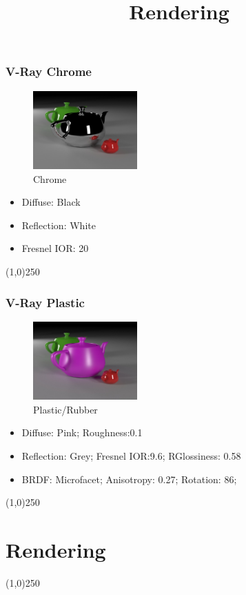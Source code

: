 \begin{frame}
\frametitle{V-Ray Chrome}
\begin{figure}
	\centering
	\includegraphics[height=3cm]{./Materials/Chrome}
	\caption{Chrome}
	\label{fig:Chrome}
\end{figure}
\begin{itemize}
	\item Diffuse: Black
	\item Reflection: White
	\item Fresnel IOR: 20 
\end{itemize}
\end{frame}
\begin{center}\line(1,0){250}\end{center}



\begin{frame}
\frametitle{V-Ray Plastic}
\begin{figure}
	\centering
	\includegraphics[height=3cm]{./Materials/Plastic}
	\caption{Plastic/Rubber}
	\label{fig:Plastic/Rubber}
\end{figure}
\begin{itemize}
	\item Diffuse: Pink; Roughness:0.1
	\item Reflection: Grey; Fresnel IOR:9.6; RGlossiness: 0.58
	\item BRDF: Microfacet; Anisotropy: 0.27; Rotation: 86; 
\end{itemize}
\end{frame}
\begin{center}\line(1,0){250}\end{center}


\section{Rendering}
\begin{frame}
\title[Rendering]{Rendering}
\titlepage
\end{frame}\begin{center}\line(1,0){250}\end{center}


